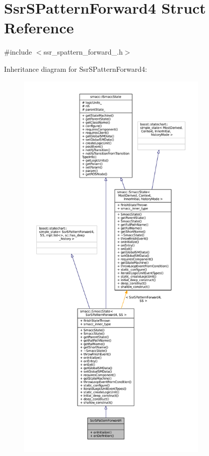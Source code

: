 \hypertarget{structSsrSPatternForward4}{}\section{Ssr\+S\+Pattern\+Forward4 Struct Reference}
\label{structSsrSPatternForward4}


{\ttfamily \#include $<$ssr\+\_\+spattern\+\_\+forward\+\_.\+h$>$}



Inheritance diagram for Ssr\+S\+Pattern\+Forward4\+:
\nopagebreak
\begin{figure}[H]
\begin{center}
\leavevmode
\includegraphics[height=550pt]{structSsrSPatternForward4__inherit__graph}
\end{center}
\end{figure}


